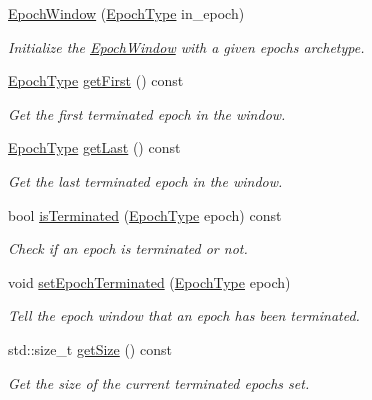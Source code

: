 \begin{DoxyCompactItemize}
\item 
\hyperlink{structvt_1_1epoch_1_1_epoch_window_ab0d58ee25bf04051ac80ff32a4fcd8e5}{Epoch\+Window} (\hyperlink{structvt_1_1epoch_1_1_epoch_type}{Epoch\+Type} in\+\_\+epoch)
\begin{DoxyCompactList}\small\item\em Initialize the {\ttfamily \hyperlink{structvt_1_1epoch_1_1_epoch_window}{Epoch\+Window}} with a given epoch\textquotesingle{}s archetype. \end{DoxyCompactList}\item 
\hyperlink{structvt_1_1epoch_1_1_epoch_type}{Epoch\+Type} \hyperlink{structvt_1_1epoch_1_1_epoch_window_ae9bbc46060c62f7adeac93620d4ae0fc}{get\+First} () const
\begin{DoxyCompactList}\small\item\em Get the first terminated epoch in the window. \end{DoxyCompactList}\item 
\hyperlink{structvt_1_1epoch_1_1_epoch_type}{Epoch\+Type} \hyperlink{structvt_1_1epoch_1_1_epoch_window_a8105180308f26a76483992775e8b4da5}{get\+Last} () const
\begin{DoxyCompactList}\small\item\em Get the last terminated epoch in the window. \end{DoxyCompactList}\item 
bool \hyperlink{structvt_1_1epoch_1_1_epoch_window_a950c2b957d27d722e9fd311a7639c989}{is\+Terminated} (\hyperlink{structvt_1_1epoch_1_1_epoch_type}{Epoch\+Type} epoch) const
\begin{DoxyCompactList}\small\item\em Check if an epoch is terminated or not. \end{DoxyCompactList}\item 
void \hyperlink{structvt_1_1epoch_1_1_epoch_window_a7dda8662e2956ec569b00827e863454a}{set\+Epoch\+Terminated} (\hyperlink{structvt_1_1epoch_1_1_epoch_type}{Epoch\+Type} epoch)
\begin{DoxyCompactList}\small\item\em Tell the epoch window that an epoch has been terminated. \end{DoxyCompactList}\item 
std\+::size\+\_\+t \hyperlink{structvt_1_1epoch_1_1_epoch_window_ac264a0a8ab40a44eb18d8192663772f2}{get\+Size} () const
\begin{DoxyCompactList}\small\item\em Get the size of the current terminated epochs set. \end{DoxyCompactList}\item 

\end{DoxyCompactItemize}
